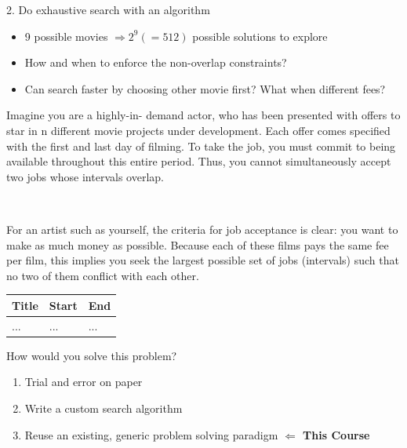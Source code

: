 \documentclass{cons-beamer}
\begin{document}
\begin{frame}{2. Do exhaustive search with an algorithm}
\begin{center}
{\begin{tikzpicture}
			\end{tikzpicture}
		}
	\end{center}
	
	\pause
	\begin{itemize}
		\item 9 possible movies $\Rightarrow 2^9 (=512)$ possible solutions to explore
		\item How and when to enforce the non-overlap constraints?
		\item Can search faster by choosing other movie first? What when different fees?
	\end{itemize}
\end{frame}

\begin{frame}
	\begin{example}
		\small
		Imagine you are a highly-in-
		demand actor, who has been presented with offers to star in n different movie
		projects under development. Each offer comes specified with the first and last day
		of filming. To take the job, you must commit to being available throughout this
		entire period. Thus, you cannot simultaneously accept two jobs whose intervals
		overlap.
		
		$ $
		
		For an artist such as yourself, the criteria for job acceptance is clear: you want
		to make as much money as possible. Because each of these films pays the same fee
		per film, this implies you seek the largest possible set of jobs (intervals) such that no two of them conflict with each other.
		
		\begin{table}[h!]
			\centering
			\tiny
			\begin{tabular}{| m{5cm} | m{2cm} | m{2cm} |}
				\hline
				\textbf{Title} & \textbf{Start} & \textbf{End} \\
				\hline
				... & ... & ... \\
				\hline
			\end{tabular}
		\end{table}
	\end{example}
	How would you solve this problem?
	\begin{enumerate}
		\item Trial and error on paper
		\item Write a custom search algorithm
		\item Reuse an existing, generic problem solving paradigm \textbf{$\Leftarrow$ This Course}
	\end{enumerate}
\end{frame}
\end{document}

